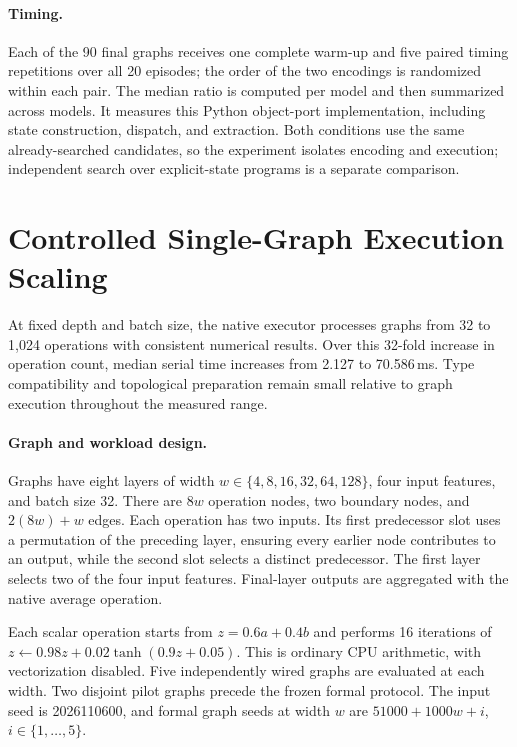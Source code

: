 \paragraph{Timing.}
Each of the 90 final graphs receives one complete warm-up and five paired timing
repetitions over all 20 episodes; the order of the two encodings is randomized
within each pair. The median ratio is computed per model and then summarized
across models. It measures this Python object-port implementation, including
state construction, dispatch, and extraction. Both conditions use the same
already-searched candidates, so the experiment isolates encoding and execution;
independent search over explicit-state programs is a separate comparison.

\section{Controlled Single-Graph Execution Scaling}
\label{app:revision_scaling}

At fixed depth and batch size, the native executor processes graphs from 32 to
1,024 operations with consistent numerical results. Over this 32-fold increase
in operation count, median serial time increases from 2.127 to 70.586\,ms.
Type compatibility and topological preparation remain small relative to graph
execution throughout the measured range.

\paragraph{Graph and workload design.}
Graphs have eight layers of width $w\in\{4,8,16,32,64,128\}$, four input
features, and batch size 32. There are $8w$ operation nodes, two boundary nodes,
and $2(8w)+w$ edges. Each operation has two inputs. Its first predecessor slot
uses a permutation of the preceding layer, ensuring every earlier node
contributes to an output, while the second slot selects a distinct predecessor.
The first layer selects two of the four input features. Final-layer outputs
are aggregated with the native average operation.

Each scalar operation starts from $z=0.6a+0.4b$ and performs 16 iterations of
$z\leftarrow0.98z+0.02\tanh(0.9z+0.05)$. This is ordinary CPU arithmetic,
with vectorization disabled. Five independently wired graphs are evaluated at
each width. Two disjoint pilot graphs precede the frozen formal protocol.
The input seed is 2026110600, and formal graph seeds at width $w$ are
$51000+1000w+i$, $i\in\{1,\ldots,5\}$.

